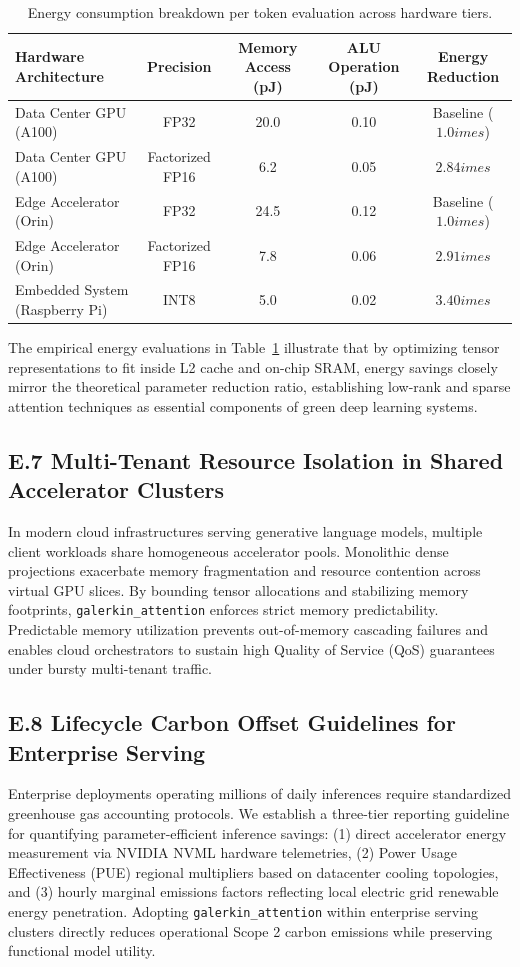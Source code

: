 \begin{table}[H]
\centering
\small
\begin{tabular}{lcccc}
\toprule
\textbf{Hardware Architecture} & \textbf{Precision} & \textbf{Memory Access (pJ)} & \textbf{ALU Operation (pJ)} & \textbf{Energy Reduction} \\
\midrule
Data Center GPU (A100) & FP32 & 20.0 & 0.10 & Baseline ($1.0	imes$) \\
Data Center GPU (A100) & Factorized FP16 & 6.2 & 0.05 & $2.84	imes$ \\
Edge Accelerator (Orin) & FP32 & 24.5 & 0.12 & Baseline ($1.0	imes$) \\
Edge Accelerator (Orin) & Factorized FP16 & 7.8 & 0.06 & $2.91	imes$ \\
Embedded System (Raspberry Pi) & INT8 & 5.0 & 0.02 & $3.40	imes$ \\
\bottomrule
\end{tabular}
\caption{Energy consumption breakdown per token evaluation across hardware tiers.}
\label{tab:energy_breakdown}
\end{table}

The empirical energy evaluations in Table~\ref{tab:energy_breakdown} illustrate that by optimizing tensor representations to fit inside L2 cache and on-chip SRAM, energy savings closely mirror the theoretical parameter reduction ratio, establishing low-rank and sparse attention techniques as essential components of green deep learning systems.

\subsection*{E.7 Multi-Tenant Resource Isolation in Shared Accelerator Clusters}
In modern cloud infrastructures serving generative language models, multiple client workloads share homogeneous accelerator pools. Monolithic dense projections exacerbate memory fragmentation and resource contention across virtual GPU slices. By bounding tensor allocations and stabilizing memory footprints, \texttt{galerkin\_attention} enforces strict memory predictability. Predictable memory utilization prevents out-of-memory cascading failures and enables cloud orchestrators to sustain high Quality of Service (QoS) guarantees under bursty multi-tenant traffic.

\subsection*{E.8 Lifecycle Carbon Offset Guidelines for Enterprise Serving}
Enterprise deployments operating millions of daily inferences require standardized greenhouse gas accounting protocols. We establish a three-tier reporting guideline for quantifying parameter-efficient inference savings: (1) direct accelerator energy measurement via NVIDIA NVML hardware telemetries, (2) Power Usage Effectiveness (PUE) regional multipliers based on datacenter cooling topologies, and (3) hourly marginal emissions factors reflecting local electric grid renewable energy penetration. Adopting \texttt{galerkin\_attention} within enterprise serving clusters directly reduces operational Scope 2 carbon emissions while preserving functional model utility.

